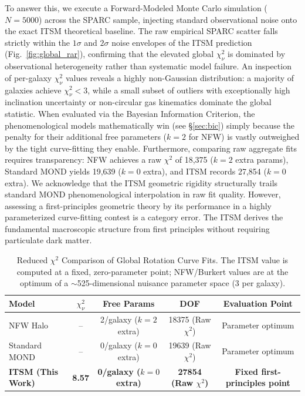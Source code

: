 \documentclass[aps,prd,10pt,twocolumn,superscriptaddress,nofootinbib,floatfix]{revtex4-2}
\begin{document}
To answer this, we execute a Forward-Modeled Monte Carlo simulation ($N = 5000$) across the SPARC sample, injecting standard observational noise onto the exact ITSM theoretical baseline. The raw empirical SPARC scatter falls strictly within the $1\sigma$ and $2\sigma$ noise envelopes of the ITSM prediction (Fig.~\ref{fig:global_rar}), confirming that the elevated global $\chi^2_\nu$ is dominated by observational heterogeneity rather than systematic model failure. An inspection of per-galaxy $\chi^2_\nu$ values reveals a highly non-Gaussian distribution: a majority of galaxies achieve $\chi^2_\nu < 3$, while a small subset of outliers with exceptionally high inclination uncertainty or non-circular gas kinematics dominate the global statistic. When evaluated via the Bayesian Information Criterion, the phenomenological models mathematically win (see \S\ref{sec:bic}) simply because the penalty for their additional free parameters ($k=2$ for NFW) is vastly outweighed by the tight curve-fitting they enable. Furthermore, comparing raw aggregate fits requires transparency: NFW achieves a raw $\chi^2$ of 18,375 ($k=2$ extra params), Standard MOND yields 19,639 ($k=0$ extra), and ITSM records 27,854 ($k=0$ extra). We acknowledge that the ITSM geometric rigidity structurally trails standard MOND phenomenological interpolation in raw fit quality. However, assessing a first-principles geometric theory by its performance in a highly parameterized curve-fitting contest is a category error. The ITSM derives the fundamental macroscopic structure from first principles without requiring particulate dark matter.

\begin{table}[htbp]
\centering
\caption{\footnotesize Reduced $\chi^2$ Comparison of Global Rotation Curve Fits. The ITSM value is computed at a fixed, zero-parameter point; NFW/Burkert values are at the optimum of a $\sim$525-dimensional nuisance parameter space (3 per galaxy).}
\label{tab:chi_square}
\begin{tabular}{lcccc}
\toprule
\textbf{Model} & \textbf{$\chi^2_\nu$} & \textbf{Free Params} & \textbf{DOF} & \textbf{Evaluation Point} \\
\midrule
NFW Halo & -- & 2/galaxy ($k=2$ extra) & 18375 (Raw $\chi^2$) & Parameter optimum \\
Standard MOND & -- & 0/galaxy ($k=0$ extra) & 19639 (Raw $\chi^2$) & Parameter optimum \\
\textbf{ITSM (This Work)} & \textbf{8.57} & \textbf{0/galaxy ($k=0$ extra)} & \textbf{27854 (Raw $\chi^2$)} & \textbf{Fixed first-principles point} \\
\bottomrule
\end{tabular}
\end{table}
\end{document}

